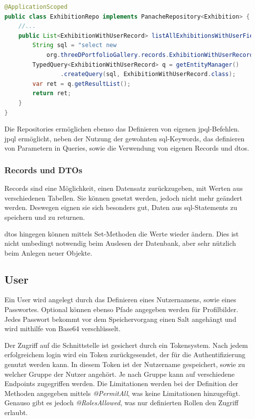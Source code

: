 \begin{lstlisting}[label=lst:panacherepo, language=Java, caption=Teil aus dem Exhibition Repository]
@ApplicationScoped
public class ExhibitionRepo implements PanacheRepository<Exhibition> {
    //...
    public List<ExhibitionWithUserRecord> listAllExhibitionsWithUserField() {
        String sql = "select new 
            org.threeDPortfolioGallery.records.ExhibitionWithUserRecord(e, u.user_name, u.icon_url) from Exhibition e join e.user u left join e.categories c";
        TypedQuery<ExhibitionWithUserRecord> q = getEntityManager()
                .createQuery(sql, ExhibitionWithUserRecord.class);
        var ret = q.getResultList();
        return ret;
    }
}
\end{lstlisting}

Die Repositories ermöglichen ebenso das Definieren von eigenen \gls{jpql}-Befehlen. 
\gls{jpql} ermöglicht, neben der Nutzung der gewohnten \gls{sql}-Keywords, das definieren von Parametern in Queries, sowie die Verwendung von eigenen Records und \gls{dto}s.

\subsubsection{Records und DTOs}
Records sind eine Möglichkeit, einen Datensatz zurückzugeben, mit Werten aus verschiedenen Tabellen. 
Sie können gesetzt werden, jedoch nicht mehr geändert werden. 
Deswegen eignen sie sich besonders gut, Daten aus \gls{sql}-Statements zu speichern und zu returnen.

\gls{dto}s hingegen können mittels Set-Methoden die Werte wieder ändern.
Dies ist nicht umbedingt notwendig beim Auslesen der Datenbank, aber sehr nützlich beim Anlegen neuer Objekte. 

\subsection{User}
Ein User wird angelegt durch das Definieren eines Nutzernamens, sowie eines Passwortes. 
Optional können ebenso Pfade angegeben werden für Profilbilder. 
Jedes Passwort bekommt vor dem Speichervorgang einen Salt angehängt und wird mithilfe von Base64 verschlüsselt. 

Der Zugriff auf die Schnittstelle ist gesichert durch ein Tokensystem. 
Nach jedem erfolgreichem login wird ein Token zurückgesendet, der für die Authentifizierung genutzt werden kann. 
In diesem Token ist der Nutzername gespeichert, sowie zu welcher Gruppe der Nutzer angehört. 
Je nach Gruppe kann auf verschiedene Endpoints zugegriffen werden. 
Die Limitationen werden bei der Definition der Methoden angegeben mittels \emph{@PermitAll}, was keine Limitationen hinzugefügt.
Genauso gibt es jedoch \emph{@RolesAllowed}, was nur definierten Rollen den Zugriff erlaubt.  


